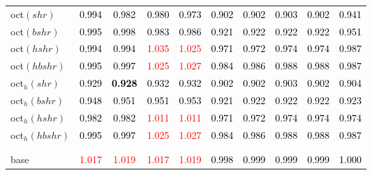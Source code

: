 \begin{tabular}[t]{l|ccccccccc}
oct$(shr)$ & \textcolor{black}{0.994} & \textcolor{black}{0.982} & \textcolor{black}{0.980} & \textcolor{black}{0.973} & \textcolor{black}{0.902} & \textcolor{black}{0.902} & \textcolor{black}{0.903} & \textcolor{black}{0.902} & \textcolor{black}{0.941}\\
oct$(bshr)$ & \textcolor{black}{0.995} & \textcolor{black}{0.998} & \textcolor{black}{0.983} & \textcolor{black}{0.986} & \textcolor{black}{0.921} & \textcolor{black}{0.922} & \textcolor{black}{0.922} & \textcolor{black}{0.922} & \textcolor{black}{0.951}\\
oct$(hshr)$ & \textcolor{black}{0.994} & \textcolor{black}{0.994} & \textcolor{red}{1.035} & \textcolor{red}{1.025} & \textcolor{black}{0.971} & \textcolor{black}{0.972} & \textcolor{black}{0.974} & \textcolor{black}{0.974} & \textcolor{black}{0.987}\\
oct$(hbshr)$ & \textcolor{black}{0.995} & \textcolor{black}{0.997} & \textcolor{red}{1.025} & \textcolor{red}{1.027} & \textcolor{black}{0.984} & \textcolor{black}{0.986} & \textcolor{black}{0.988} & \textcolor{black}{0.988} & \textcolor{black}{0.987}\\
oct$_h(shr)$ & \textcolor{black}{0.929} & \textcolor{black}{\textbf{0.928}} & \textcolor{black}{0.932} & \textcolor{black}{0.932} & \textcolor{black}{0.902} & \textcolor{black}{0.902} & \textcolor{black}{0.903} & \textcolor{black}{0.902} & \textcolor{black}{0.904}\\
oct$_h(bshr)$ & \textcolor{black}{0.948} & \textcolor{black}{0.951} & \textcolor{black}{0.951} & \textcolor{black}{0.953} & \textcolor{black}{0.921} & \textcolor{black}{0.922} & \textcolor{black}{0.922} & \textcolor{black}{0.922} & \textcolor{black}{0.923}\\
oct$_h(hshr)$ & \textcolor{black}{0.982} & \textcolor{black}{0.982} & \textcolor{red}{1.011} & \textcolor{red}{1.011} & \textcolor{black}{0.971} & \textcolor{black}{0.972} & \textcolor{black}{0.974} & \textcolor{black}{0.974} & \textcolor{black}{0.974}\\
oct$_h(hbshr)$ & \textcolor{black}{0.995} & \textcolor{black}{0.997} & \textcolor{red}{1.025} & \textcolor{red}{1.027} & \textcolor{black}{0.984} & \textcolor{black}{0.986} & \textcolor{black}{0.988} & \textcolor{black}{0.988} & \textcolor{black}{0.987}\\[-1.5ex]
\hline\\[-1.5ex]
\addlinespace[0.3em]
\multicolumn{10}{c}{\textbf{$k = 1$}}\\
base & \textcolor{red}{1.017} & \textcolor{red}{1.019} & \textcolor{red}{1.017} & \textcolor{red}{1.019} & \textcolor{black}{0.998} & \textcolor{black}{0.999} & \textcolor{black}{0.999} & \textcolor{black}{0.999} & \textcolor{black}{1.000}\\

\end{tabular}
